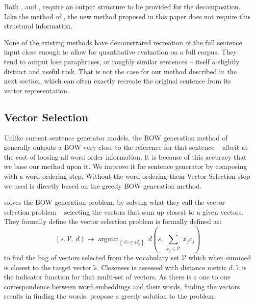\documentclass[11pt]{article}
\theoremstyle{plain}
\theoremstyle{definition}
\DeclareMathOperator*{\argmin}{argmin}
\begin{document}
Both \textcite{Dinu2014CompositionalGeneration}, and  \textcite{iyyer2014generating}, require an output structure to be provided for the decomposition. Like the method of  \textcite{Bowman2015SmoothGeneration}, the new method proposed in this paper does not require this structural information.

None of the existing methods have demonstrated recreation of the full sentence input close enough to allow for quantitative evaluation on a full corpus. They tend to output lose paraphrases, or roughly similar sentences -- itself a slightly distinct and useful task.  That is not the case for our method described in the next section, which can often exactly recreate the original sentence from its vector representation.


\subsection{Vector Selection}
\renewcommand{\c}{\tilde{c}}
\newcommand{\s}{\tilde{s}}
\newcommand{\x}{\tilde{x}}
\renewcommand{\t}{\tilde{t}}
\newcommand{\N}{\mathbb{N}}
\newcommand{\R}{\mathbb{R}}
\newcommand{\V}{\mathcal{V}}
\renewcommand{\B}{\mathcal{B}}

Unlike current sentence generator models, the BOW generation method of \textcite{White2015BOWgen} generally outputs a BOW very close to the reference for that sentence -- albeit at the cost of loosing all word order information. It is because of this accuracy that we base our method upon it. We improve it for sentence generator by composing with a word ordering step. Without the word ordering them Vector Selection step we used is directly based on the greedy BOW generation method.

\textcite{White2015BOWgen} solves the BOW generation problem, by solving what they call the vector selection problem -- selecting the vectors that sum up closest to a given vectors. They formally define the vector selection problem is formally defined as:
\[
(\s,\V,\,d) \mapsto \argmin_{\left\{ \forall\c\in\N_{0}^{V}\right\} }\:d( \s,\,\sum_{\x_j\in\V}\:\x_{j}c_{j})
\]
to find the bag of vectors selected from the vocabulary set $\V$ which when summed is closest to the target vector $\s$. Closeness is assessed with distance metric $d$. $\c$ is the indicator function for that multi-set of vectors. As there is a one to one correspondence between word embeddings and their words, finding the vectors results in finding the words. \textcite{White2015BOWgen} propose a greedy solution to the problem.
 
\end{document}
